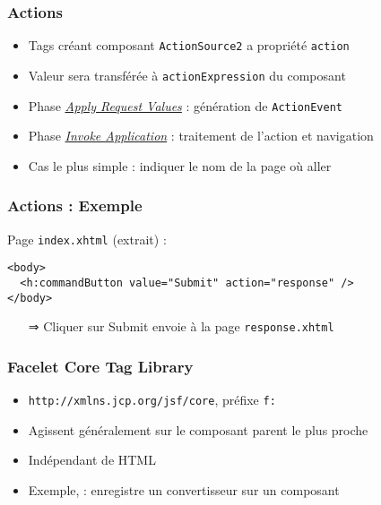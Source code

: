 \documentclass[english, french]{beamer}
\begin{document}
\begin{frame}
	\frametitle{Actions}
	\begin{itemize}
		\item Tags créant composant \texttt{ActionSource2} a propriété \texttt{action}
		\item Valeur sera transférée à \texttt{actionExpression} du composant
		\item Phase \hyperlink{ph-arv}{\emph{Apply Request Values}} : génération de \texttt{ActionEvent}
		\item Phase \hyperlink{ph-ia}{\emph{Invoke Application}} : traitement de l’action et navigation
		\item Cas le plus simple : indiquer le nom de la page où aller
	\end{itemize}
\end{frame}

\begin{frame}[fragile]
	\frametitle{Actions : Exemple}
	Page \texttt{index.xhtml} (extrait) :
	\begin{lstlisting}[aboveskip=1em, belowskip=1em]
<body>
  <h:commandButton value="Submit" action="response" />
</body>
	\end{lstlisting}
	\begin{itemize}
		\item[⇒] Cliquer sur Submit envoie à la page \texttt{response.xhtml}
	\end{itemize}
\end{frame}

\begin{frame}
	\frametitle{Facelet Core Tag Library}
	\begin{itemize}
		\item \texttt{http://xmlns.jcp.org/jsf/core}, préfixe \texttt{f:}
		\item Agissent {\tiny généralement} sur le composant parent le plus proche
		\item Indépendant de HTML
		\item Exemple,  : enregistre un convertisseur sur un composant
	\end{itemize}
\end{frame}
\end{document}
